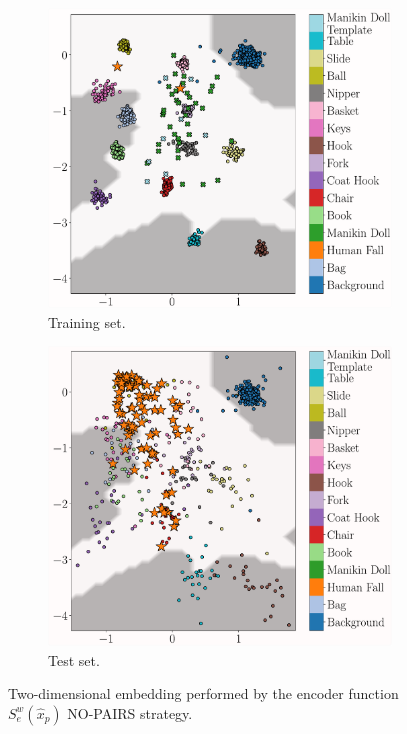\begin{figure}[H]
	\centering
	\begin{subfigure}[b]{0.475\textwidth}
		\centering
		\includegraphics[width=\textwidth]{img/eeai/embedding/no_template_pairs/fold_4_train}
		\caption[]%
		{Training set.}    
		\label{fig:train-no-pairs}
	\end{subfigure}
	\hfill
	\begin{subfigure}[b]{0.475\textwidth}  
		\centering 
		\includegraphics[width=\textwidth]{img/eeai/embedding/no_template_pairs/fold_4_moquette}
		\caption[]%
		{Test set.}    
		\label{fig:test-no-pairs}
	\end{subfigure}
	\caption[]
	{\small Two-dimensional embedding performed by the encoder function $S_e^w(\hat{x}_{p})$ NO-PAIRS strategy.} 
	\label{fig:no-pairs}
\end{figure}

